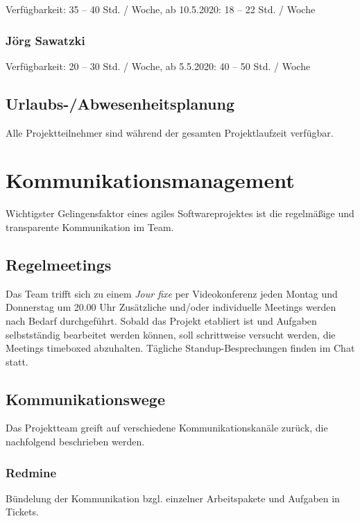 \documentclass[a4paper,11pt,listof=numbered,glossary=totoc,parskip=half]{scrreprt}
\begin{document}
Verfügbarkeit: 35 -- 40 Std. / Woche, ab 10.5.2020: 18 -- 22 Std. / Woche

\subsection{Jörg Sawatzki}

Verfügbarkeit: 20 -- 30 Std. / Woche, ab 5.5.2020: 40 -- 50 Std. / Woche


\section{Urlaubs-/Abwesenheitsplanung}
Alle Projektteilnehmer sind während der gesamten Projektlaufzeit verfügbar.

\newpage
	\chapter{Kommunikationsmanagement}
	\label{sec:kommunikationsmanagement}
	
Wichtigster Gelingensfaktor eines agiles Softwareprojektes ist die regelmäßige und transparente Kommunikation im Team.

\section{Regelmeetings}

Das Team trifft sich zu einem \textit{Jour fixe} per Videokonferenz jeden Montag und Donnerstag um 20.00 Uhr
Zusätzliche und/oder individuelle Meetings werden nach Bedarf durchgeführt.
Sobald das Projekt etabliert ist und Aufgaben selbstständig bearbeitet werden können, soll schrittweise versucht werden, die Meetings timeboxed abzuhalten.
Tägliche Standup-Besprechungen finden im Chat statt. 

\section{Kommunikationswege}

Das Projektteam greift auf verschiedene Kommunikationskanäle zurück, die nachfolgend beschrieben werden.

\subsection{Redmine}

Bündelung der Kommunikation bzgl. einzelner Arbeitspakete und Aufgaben in Tickets.
\end{document}
